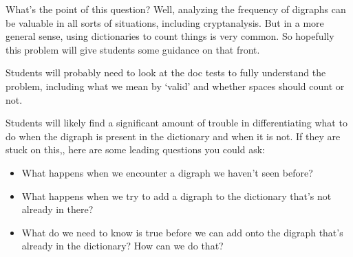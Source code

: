 \begin{questionmeta}
What's the point of this question? Well, analyzing the frequency of digraphs can be valuable in all sorts of situations, including cryptanalysis. But in a more general sense, using dictionaries to count things is very common. So hopefully this problem will give students some guidance on that front.

Students will probably need to look at the doc tests to fully understand the problem, including what we mean by `valid' and whether spaces should count or not. 

Students will likely find a significant amount of trouble in differentiating what to do when the digraph is present in the dictionary and when it is not. If they are stuck on this,, here are some leading questions you could ask: 
\begin{itemize}
    \item What happens when we encounter a digraph we haven't seen before?
    \item What happens when we try to add a digraph to the dictionary that's not already in there? 
    \item What do we need to know is true before we can add onto the digraph that's already in the dictionary? How can we do that? 
\end{itemize}
\end{questionmeta}